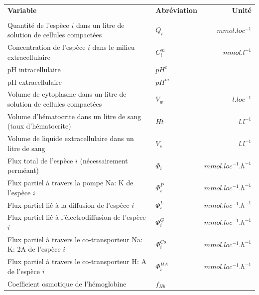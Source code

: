 \documentclass[a4paper,fleqn]{article}
\begin{document}
\begin{tabular}{p{8cm}lr}

\textbf{Variable}                                                      & \textbf{Abréviation}     & \textbf{Unité}      \\
\\
Quantité de l'espèce $i$ dans un litre de solution de cellules compactées \footnotemark[1]  & $Q_i$                    & $mmol.loc^{-1}$     \\
Concentration de l'espèce $i$ dans le milieu extracellulaire               & $C_{i}^{m}$              & $mmol.l^{-1}$       \\
pH intracellulaire                                                     & $pH^c$                                         \\
pH extracellulaire                                                     & $pH^m$                                         \\
Volume de cytoplasme dans un litre de solution de cellules compactées \footnotemark[1]	& $V_w$ 			 & $l.loc^{-1}$      \\
Volume d'hématocrite dans un litre de sang (taux d'hématocrite)             & $Ht$          & $l.l^{-1}$                   \\
Volume de liquide extracellulaire dans un litre de sang                     & $V_s$                    & $l.l^{-1}$        \\
Flux total de l'espèce $i$ (nécessairement perméant)                       & $\Phi_i$                 & $mmol.loc^{-1}.h^{-1}$\\
Flux partiel à travers la pompe Na: K de l'espèce $i$                      & $\Phi_{i}^{P}$           & $mmol.loc^{-1}.h^{-1}$\\
Flux partiel lié à la diffusion de l'espèce $i$                             & $\Phi_{i}^{L}$           & $mmol.loc^{-1}.h^{-1}$\\
Flux partiel lié à l'électrodiffusion de l'espèce $i$                      & $\Phi_{i}^{G}$           & $mmol.loc^{-1}.h^{-1}$\\
Flux partiel à travers le co-transporteur Na: K: 2A de l'espèce $i$         & $\Phi_{i}^{Co}$          & $mmol.loc^{-1}.h^{-1}$\\
Flux partiel à travers le co-transporteur H: A de l'espèce $i$              & $\Phi_{i}^{HA}$          & $mmol.loc^{-1}.h^{-1}$\\
Coefficient osmotique de l'hémoglobine                                 & $f_{Hb}$                                       \\

\end{tabular}\\
\\
\\
\end{document}

